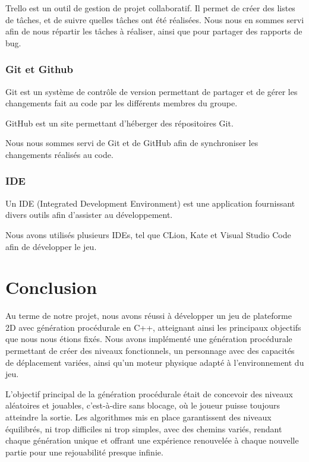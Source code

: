 \documentclass[10pt]{report}
\begin{document}
Trello est un outil de gestion de projet collaboratif.
Il permet de créer des listes de tâches, et de suivre quelles tâches ont été réalisées.
Nous nous en sommes servi afin de nous répartir les tâches à réaliser, ainsi que pour partager des rapports de bug.

\subsubsection{Git et Github}

Git est un système de contrôle de version permettant de partager et de gérer les changements fait au code par
les différents membres du groupe.

GitHub est un site permettant d'héberger des répositoires Git.

Nous nous sommes servi de Git et de GitHub afin de synchroniser les changements réalisés au code.

\subsubsection{IDE}

Un IDE (Integrated Development Environment) est une application fournissant divers outils afin d'assister au
développement.

Nous avons utilisés plusieurs IDEs, tel que CLion, Kate et Visual Studio Code afin de développer le jeu.

\newpage

\section{Conclusion}
Au terme de notre projet, nous avons réussi à développer un jeu de plateforme 2D avec génération procédurale en C++, atteignant ainsi les principaux objectifs que nous nous étions fixés. Nous avons implémenté une génération procédurale permettant de créer des niveaux fonctionnels, un personnage avec des capacités de déplacement variées, ainsi qu'un moteur physique adapté à l’environnement du jeu.

L’objectif principal de la génération procédurale était de concevoir des niveaux aléatoires et jouables, c’est-à-dire sans blocage, où le joueur puisse toujours atteindre la sortie. Les algorithmes mis en place garantissent des niveaux équilibrés, ni trop difficiles ni trop simples, avec des chemins variés, rendant chaque génération unique et offrant une expérience renouvelée à chaque nouvelle partie pour une rejouabilité presque infinie.
\end{document}
